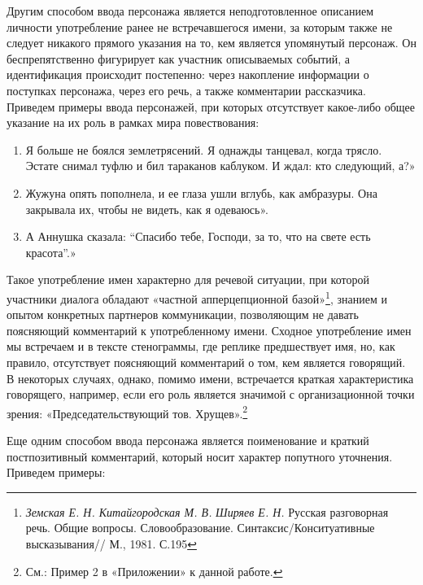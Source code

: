 \documentclass{kursa4}
\begin{document}
{        Другим способом ввода персонажа является неподготовленное
        описанием личности употребление ранее не встречавшегося имени, за
        которым также не следует никакого прямого указания на то, кем является
        упомянутый персонаж. Он беспрепятственно фигурирует как участник
        описываемых событий, а идентификация происходит постепенно: через
        накопление информации о поступках персонажа, через его речь, а также
        комментарии рассказчика. Приведем примеры ввода персонажей, при которых
        отсутствует какое-либо общее указание на их роль в рамках мира
        повествования: 

        \begin{enumerate}
          \item Я больше не боялся землетрясений. Я однажды танцевал, когда
          трясло. Эстате снимал туфлю и бил тараканов каблуком. И ждал: кто
          следующий, а?»
          \item Жужуна опять пополнела, и ее глаза ушли вглубь, как амбразуры.
          Она закрывала их, чтобы не видеть, как я одеваюсь». 
          \item А Аннушка сказала: “Спасибо тебе, Господи, за то, что на свете
          есть красота”.»
        \end{enumerate}

        Такое употребление имен характерно для речевой ситуации, при которой
        участники диалога обладают «частной апперцепционной
        базой»\footnote{\textit{Земская Е. Н. Китайгородская М. В.
        }\textit{Ширяев Е. Н. }Русская разговорная речь. Общие вопросы.
        Словообразование. Синтаксис/Конситуативные высказывания// М., 1981.
        С.195}, знанием и опытом конкретных партнеров коммуникации,
        позволяющим не давать поясняющий комментарий к употребленному имени.
        Сходное употребление имен мы встречаем и в тексте стенограммы, где
        реплике предшествует имя, но, как правило, отсутствует поясняющий
        комментарий о том, кем является говорящий. В некоторых случаях, однако,
        помимо имени, встречается краткая характеристика говорящего, например,
        если его роль является значимой с организационной точки зрения:
        «Председательствующий тов. Хрущев».\footnote{См.: Пример 2 в
        «Приложении» к данной работе.} 

        Еще одним способом ввода персонажа является поименование и краткий
        постпозитивный комментарий, который носит характер попутного уточнения.
        Приведем примеры:

}
\end{document}

